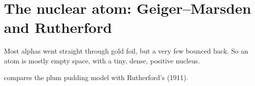 \section{The nuclear atom: Geiger--Marsden and Rutherford}\label{ch2:sec:nucleus}

\begin{bigidea}
Most alphas went straight through gold foil, but a very few bounced back. So an atom is
mostly empty space, with a tiny, dense, positive nucleus.
\end{bigidea}

\begin{keywords}
\end{keywords}

 compares the plum pudding model with Rutherford's  (1911).

